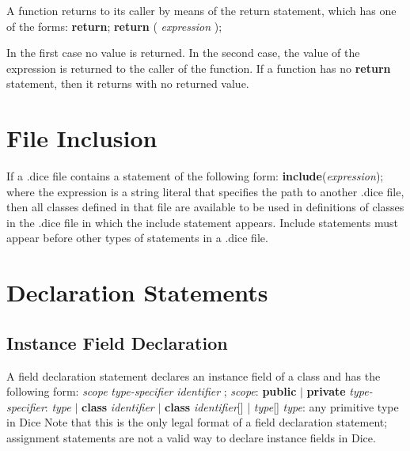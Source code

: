 \begin{homeworkProblem}
    A function returns to its caller by means of the return statement, which has one of the forms:
    \newline
    \newline
		\textbf{return};
    \newline
    \textbf{return} ( \textit{expression} );

        In the first case no value is returned. In the second case, the value of the expression is returned to the caller of the function. If a function has no \textbf{return} statement, then it returns with no returned value. 

	\section{File Inclusion}
	If a .dice file contains a statement of the following form:
    \newline
	\textbf{include}(\textit{expression});
	\newline
    where the expression is a string literal that specifies the path to another .dice file, then all classes defined in that file are available to be used in definitions of classes in the .dice file in which the include statement appears. Include statements must appear before other types of statements in a .dice file.
	
	\section{Declaration Statements}
    \subsection{Instance Field Declaration}
	A field declaration statement declares an instance field of a class and has the following form:
    \newline
    \textit{scope} \textit{type-specifier} \textit{identifier} ;
    \newline
    \textit{scope}: \textbf{public} $|$ \textbf{private}
	\newline
    \textit{type-specifier}: \textit{type} $|$ \textbf{class} \textit{identifier} $|$ \textbf{class} \textit{identifier}[] | \textit{type}[]
    \newline
    \textit{type}: any primitive type in Dice
    \newline
    Note that this is the only legal format of a field declaration statement; assignment statements are not a valid way to declare instance fields in Dice.


\end{homeworkProblem}
